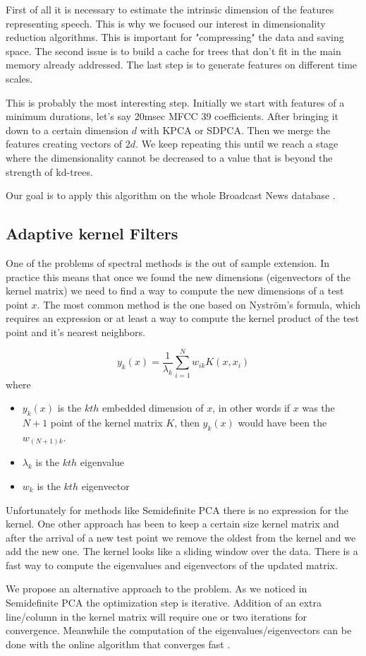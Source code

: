 \documentclass[12pt,letterpaper,doublespaced,ETD,dvips,proposal]{gtthesis}
\begin{document}
\begin{Body}
First of all it is necessary to estimate the intrinsic dimension of the features representing speech. This is why we focused our interest in dimensionality reduction algorithms. This is important for "compressing" the data and saving space. The second issue is to build a cache for trees that don't fit in the main memory already addressed. The last step is to generate features on different time scales.

This is probably the most interesting step. Initially we start with features of a minimum durations, let's say 20msec MFCC 39 coefficients. After bringing it down to a certain dimension $d$ with KPCA or SDPCA. Then we merge the features creating vectors of $2d$. We keep repeating this until we reach a stage where the dimensionality cannot be decreased to a value that is beyond the strength of kd-trees.

Our goal is to apply this algorithm on the whole Broadcast News database \cite{graff1997bns}.

\subsection{Adaptive kernel Filters}
One of the problems of spectral methods is the out of sample
extension. In practice this means that once we found the new
dimensions (eigenvectors of the kernel matrix) we need to find a way
to compute the new dimensions of a test point $x$. The most common
method is the one based on Nystr\"{o}m's formula, which requires an
expression or at least a way to compute the kernel product of the
test point and it's nearest neighbors.

\begin{equation}
y_k(x) = \frac{1}{\lambda_k}\sum_{i=1}^{N} w_{ik}K(x, x_i)
\end{equation}
where
\begin{itemize}
  \item $y_k(x)$ is the $kth$ embedded dimension of $x$, in other
  words if $x$ was the $N+1$ point of the kernel matrix $K$, then
  $y_k(x)$ would have been the $w_{(N+1)k}$.
  \item $\lambda_k$ is the $kth$ eigenvalue
  \item $w_k$ is the $kth$ eigenvector
\end{itemize}
Unfortunately for methods like Semidefinite PCA there is no
expression for the kernel.
One other approach \cite{vanvaerenbergh2006swk} has been to keep a certain size kernel matrix and
after the arrival of a new test point we remove the oldest from the
kernel and we add the new one. The kernel looks like a sliding
window over the data. There is a fast way to compute the eigenvalues
and eigenvectors of the updated matrix.

We propose an alternative approach to the problem. As we noticed in
Semidefinite PCA the optimization step is iterative. Addition of an
extra line/column in the kernel matrix will require one or two
iterations for convergence. Meanwhile the computation of the
eigenvalues/eigenvectors can be done with the  online algorithm that
converges fast \cite{gorrell2006gha}.

\end{Body}
\end{document}
